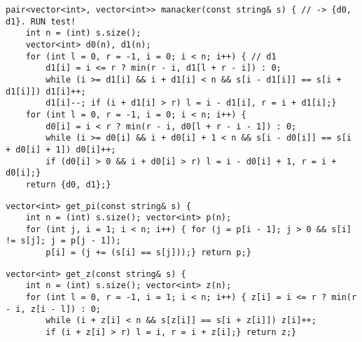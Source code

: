 \documentclass[a4paper,12pt]{article}
\begin{document}
\begin{verbatim}
pair<vector<int>, vector<int>> manacker(const string& s) { // -> {d0, d1}. RUN test!
    int n = (int) s.size();
    vector<int> d0(n), d1(n);
    for (int l = 0, r = -1, i = 0; i < n; i++) { // d1
        d1[i] = i <= r ? min(r - i, d1[l + r - i]) : 0;
        while (i >= d1[i] && i + d1[i] < n && s[i - d1[i]] == s[i + d1[i]]) d1[i]++;
        d1[i]--; if (i + d1[i] > r) l = i - d1[i], r = i + d1[i];}
    for (int l = 0, r = -1, i = 0; i < n; i++) {
        d0[i] = i < r ? min(r - i, d0[l + r - i - 1]) : 0;
        while (i >= d0[i] && i + d0[i] + 1 < n && s[i - d0[i]] == s[i + d0[i] + 1]) d0[i]++;
        if (d0[i] > 0 && i + d0[i] > r) l = i - d0[i] + 1, r = i + d0[i];}
    return {d0, d1};}
\end{verbatim}

\begin{verbatim}
vector<int> get_pi(const string& s) {
    int n = (int) s.size(); vector<int> p(n);
    for (int j, i = 1; i < n; i++) { for (j = p[i - 1]; j > 0 && s[i] != s[j]; j = p[j - 1]);
        p[i] = (j += (s[i] == s[j]));} return p;}
\end{verbatim}

\begin{verbatim}
vector<int> get_z(const string& s) {
    int n = (int) s.size(); vector<int> z(n);
    for (int l = 0, r = -1, i = 1; i < n; i++) { z[i] = i <= r ? min(r - i, z[i - l]) : 0;
        while (i + z[i] < n && s[z[i]] == s[i + z[i]]) z[i]++;
        if (i + z[i] > r) l = i, r = i + z[i];} return z;}
\end{verbatim}
\end{document}
